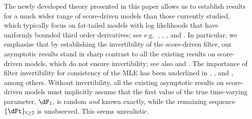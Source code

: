 The newly developed theory presented in this paper allows us to establish results for  a much wider range of score-driven models than those currently studied,
which typically focus on fat-tailed models with log likelihoods that have uniformly bounded third order derivatives; see e.g.~\cite{harvey2013},  \cite{harveyluati2014}, \cite{CaivanoHarvey2014}, and \cite{ryoko2016}. 
In particular,
we emphasize that by establishing the invertibility of the score-driven filter, our asymptotic results stand in sharp contrast to all the existing results on score-driven models, which do not ensure invertibility; see also \citet{AndresHarvey2012} and \citet{HarveyLange2015,HarveyLange2016}.
The importance of filter invertibility for consistency of the MLE has been underlined in \cite{smikosch2006}, \citet{RePEc:pra:mprapa:46027}, and \cite{BGKW2016},  among others. Without invertibility, all the existing asymptotic results on score-driven models must implicitly assume that the first value of the true time-varying parameter, $\dF_{1}$, is random \emph{and} known exactly, while the remaining sequence  $\{\dFt\}_{t \geq 2}$ is unobserved. This seems unrealistic.







